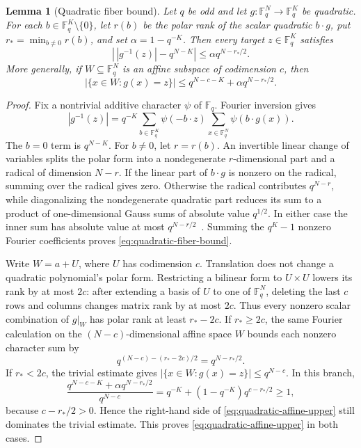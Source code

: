 \documentclass[11pt]{article}
\newtheorem{lemma}[lemma]{Lemma}
\newcommand{\F}{\mathbb F}
\begin{document}
\begin{lemma}[Quadratic fiber bound]\label{lem:quadratic-fiber-bound}
Let $q$ be odd and let $g:\F_q^N\to\F_q^K$ be quadratic.  For each
$b\in\F_q^K\setminus\{0\}$, let $r(b)$ be the polar rank of the scalar
quadratic $b\cdot g$, put $r_*=\min_{b\ne0}r(b)$, and set
$\alpha=1-q^{-K}$.  Then every target $z\in\F_q^K$ satisfies
\begin{equation}\label{eq:quadratic-fiber-bound}
 \left|\,|g^{-1}(z)|-q^{N-K}\right|
 \le \alpha q^{N-r_*/2}.
\end{equation}
More generally, if $W\subseteq\F_q^N$ is an affine subspace of codimension
$c$, then
\begin{equation}\label{eq:quadratic-affine-upper}
 |\{x\in W:g(x)=z\}|
 \le q^{N-c-K}+\alpha q^{N-r_*/2}.
\end{equation}
\end{lemma}

\begin{proof}
Fix a nontrivial additive character $\psi$ of $\F_q$.  Fourier inversion gives
\[
 |g^{-1}(z)|
 =q^{-K}\sum_{b\in\F_q^K}\psi(-b\cdot z)
   \sum_{x\in\F_q^N}\psi(b\cdot g(x)).
\]
The $b=0$ term is $q^{N-K}$.  For $b\ne0$, let $r=r(b)$.  An invertible
linear change of variables splits the polar form into a nondegenerate
$r$-dimensional part and a radical of dimension $N-r$.  If the linear part of
$b\cdot g$ is nonzero on the radical, summing over the radical gives zero.
Otherwise the radical contributes $q^{N-r}$, while diagonalizing the
nondegenerate quadratic part reduces its sum to a product of one-dimensional
Gauss sums of absolute value $q^{1/2}$.  In either case the inner sum has
absolute value at most $q^{N-r/2}$~\cite{Lam2005}.  Summing the $q^K-1$
nonzero Fourier coefficients proves \eqref{eq:quadratic-fiber-bound}.

Write $W=a+U$, where $U$ has codimension $c$.  Translation does not change a
quadratic polynomial's polar form.  Restricting a bilinear form to
$U\times U$ lowers its rank by at most $2c$: after extending a basis of $U$ to
one of $\F_q^N$, deleting the last $c$ rows and columns changes matrix rank by
at most $2c$.  Thus every nonzero scalar combination of $g|_W$ has polar rank
at least $r_*-2c$.  If $r_*\ge2c$, the same Fourier calculation on the
$(N-c)$-dimensional affine space $W$ bounds each nonzero character sum by
\[
 q^{(N-c)-(r_*-2c)/2}=q^{N-r_*/2}.
\]
If $r_*<2c$, the trivial estimate gives
$|\{x\in W:g(x)=z\}|\le q^{N-c}$.  In this branch,
\[
 \frac{q^{N-c-K}+\alpha q^{N-r_*/2}}{q^{N-c}}
 =q^{-K}+(1-q^{-K})q^{c-r_*/2}\ge1,
\]
because $c-r_*/2>0$.  Hence the right-hand side of
\eqref{eq:quadratic-affine-upper} still dominates the trivial estimate.  This
proves \eqref{eq:quadratic-affine-upper} in both cases.
\end{proof}
\end{document}
